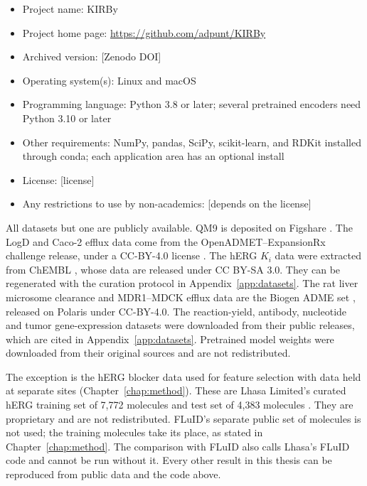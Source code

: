 \begin{itemize}
    \item Project name: KIRBy
    \item Project home page: \url{https://github.com/adpunt/KIRBy}
    \item Archived version: [Zenodo DOI]
    \item Operating system(s): Linux and macOS
    \item Programming language: Python 3.8 or later; several pretrained encoders need Python 3.10 or later
    \item Other requirements: NumPy, pandas, SciPy, scikit-learn, and RDKit installed through conda; each application area has an optional install
    \item License: [license]
    \item Any restrictions to use by non-academics: [depends on the license]
\end{itemize}


All datasets but one are publicly available. QM9 \citep{Ramakrishnan2014} is deposited on Figshare \citep{qm9_dataset}. The LogD and Caco-2 efflux data come from the OpenADMET--ExpansionRx challenge release, under a CC-BY-4.0 license \citep{openadmet}. The hERG $K_i$ data were extracted from ChEMBL \citep{Zdrazil2023}, whose data are released under CC BY-SA 3.0. They can be regenerated with the curation protocol in Appendix~\ref{app:datasets}. The rat liver microsome clearance and MDR1--MDCK efflux data are the Biogen ADME set \citep{fang2023}, released on Polaris \citep{polaris} under CC-BY-4.0. The reaction-yield, antibody, nucleotide and tumor gene-expression datasets were downloaded from their public releases, which are cited in Appendix~\ref{app:datasets}. Pretrained model weights were downloaded from their original sources and are not redistributed.

The exception is the hERG blocker data used for feature selection with data held at separate sites (Chapter~\ref{chap:method}). These are Lhasa Limited's curated hERG training set of 7,772 molecules and test set of 4,383 molecules \citep{Hanser2025}. They are proprietary and are not redistributed. FLuID's separate public set of molecules is not used; the training molecules take its place, as stated in Chapter~\ref{chap:method}. The comparison with FLuID also calls Lhasa's FLuID code and cannot be run without it. Every other result in this thesis can be reproduced from public data and the code above.


